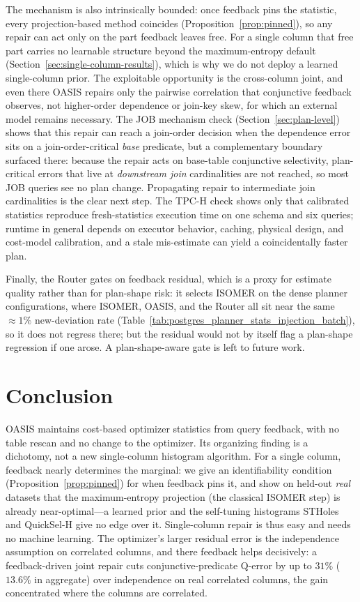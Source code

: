 \documentclass[preprint,12pt]{elsarticle}
\begin{document}
The mechanism is also intrinsically bounded: once feedback pins the statistic, every
projection-based method coincides (Proposition~\ref{prop:pinned}), so any repair can act only
on the part feedback leaves free. For a single column that free part carries no
learnable structure beyond the maximum-entropy default
(Section~\ref{sec:single-column-results}), which is why we do not deploy a learned
single-column prior. The exploitable opportunity is the cross-column joint, and even there
OASIS repairs only the pairwise correlation that conjunctive feedback observes, not
higher-order dependence or join-key skew, for which an external model remains necessary.
The JOB mechanism check (Section~\ref{sec:plan-level}) shows that this repair can reach a
join-order decision when the dependence error sits on a join-order-critical \emph{base}
predicate, but a complementary boundary surfaced there: because the repair acts on base-table
conjunctive selectivity, plan-critical errors that live at \emph{downstream join}
cardinalities are not reached, so most JOB queries see no plan change.
Propagating repair to intermediate join cardinalities is the clear next step. The TPC-H check shows only that calibrated statistics reproduce
fresh-statistics execution time on one schema and six queries; runtime in general depends
on executor behavior, caching, physical design, and cost-model calibration, and a stale
mis-estimate can yield a coincidentally faster plan.

Finally, the Router gates on feedback
residual, which is a proxy for estimate quality rather than for plan-shape risk: it selects
ISOMER on the dense planner configurations, where ISOMER, OASIS, and the Router all sit near
the same $\approx 1\%$ new-deviation rate (Table~\ref{tab:postgres_planner_stats_injection_batch}),
so it does not regress there; but the residual would not by itself flag a plan-shape
regression if one arose. A plan-shape-aware gate is left to future work.

\section{Conclusion}
\label{sec:conclusion}

OASIS maintains cost-based optimizer statistics from query feedback, with no table rescan
and no change to the optimizer. Its organizing finding is a dichotomy, not a new
single-column histogram algorithm. For a single column, feedback nearly determines the marginal: we give an identifiability condition
(Proposition~\ref{prop:pinned}) for when feedback pins it, and show on held-out \emph{real}
datasets that the maximum-entropy projection (the classical ISOMER step) is already
near-optimal---a learned prior and the self-tuning histograms STHoles and QuickSel-H give no
edge over it. Single-column repair is thus easy and needs no machine learning. The
optimizer's larger residual error is the independence assumption on correlated columns, and
there feedback helps decisively: a feedback-driven joint repair cuts conjunctive-predicate
Q-error by up to $31\%$ ($13.6\%$ in aggregate) over independence on real correlated columns,
the gain concentrated where the columns are correlated.
\end{document}
